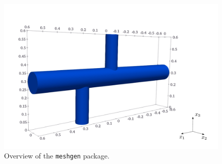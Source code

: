 \begin{figure}[H]
	\centering
	\vspace{6mm}
	\includegraphics[width=.99\textwidth]{figures/stl.pdf}
	\vspace{4mm}
	\caption{Overview of the \texttt{meshgen} package.}
	\label{fig:stl}
\end{figure}
